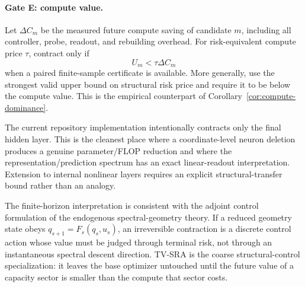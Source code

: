 \paragraph{Gate E: compute value.}
Let $\Delta C_m$ be the measured future compute saving of candidate $m$, including all controller, probe, readout, and rebuilding overhead. For risk-equivalent compute price $\tau$, contract only if
\[
\boxed{U_m<\tau\Delta C_m}
\]
when a paired finite-sample certificate is available. More generally, use the strongest valid upper bound on structural risk price and require it to be below the compute value. This is the empirical counterpart of Corollary~\ref{cor:compute-dominance}.

\begin{center}
\end{center}

The current repository implementation intentionally contracts only the final hidden layer. This is the cleanest place where a coordinate-level neuron deletion produces a genuine parameter/FLOP reduction and where the representation/prediction spectrum has an exact linear-readout interpretation. Extension to internal nonlinear layers requires an explicit structural-transfer bound rather than an analogy.

The finite-horizon interpretation is consistent with the adjoint control formulation of the endogenous spectral-geometry theory. If a reduced geometry state obeys $q_{s+1}=F_s(q_s,u_s)$, an irreversible contraction is a discrete control action whose value must be judged through terminal risk, not through an instantaneous spectral descent direction. TV-SRA is the coarse structural-control specialization: it leaves the base optimizer untouched until the future value of a capacity sector is smaller than the compute that sector costs.

